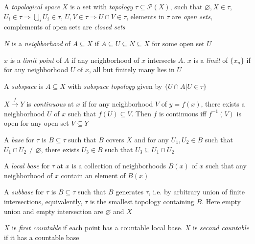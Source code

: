 \documentclass[main]{subfiles}
\begin{document}
\begin{definition}
A \textit{topological space} $X$ is a set with \textit{topology} $\tau\subseteq\mathscr{P}(X)$, such that $\varnothing,X\in\tau$, $U_i\in\tau\Rightarrow\bigcup_iU_i\in\tau$, $U,V\in\tau\Rightarrow U\cap V\in\tau$, elements in $\tau$ are \textit{open sets}, complements of open sets are \textit{closed sets} \par
$N$ is a \textit{neighborhood} of $A\subseteq X$ if $A\subseteq U\subseteq N\subseteq X$ for some open set $U$ \par
$x$ is a \textit{limit point} of $A$ if any neighborhood of $x$ intersects $A$. $x$ is a \textit{limit} of $\{x_n\}$ if for any neighborhood $U$ of $x$, all but finitely many lies in $U$ \par
A \textit{subspace} is $A\subseteq X$ with \textit{subspace topology} given by $\{U\cap A|U\in\tau\}$
\end{definition}

\begin{definition}
$X\xrightarrow fY$ is \textit{continuous} at $x$ if for any neighborhood $V$ of $y=f(x)$, there exists a neighborhood $U$ of $x$ such that $f(U)\subseteq V$. Then $f$ is continuous iff $f^{-1}(V)$ is open for any open set $V\subseteq Y$
\end{definition}

\begin{definition}
A \textit{base} for $\tau$ is $B\subseteq\tau$ such that $B$ covers $X$ and for any $U_1,U_2\in B$ such that $U_1\cap U_2\neq\varnothing$, there exists $U_3\in B$ such that $U_3\subseteq U_1\cap U_2$ \par
A \textit{local base} for $\tau$ at $x$ is a collection of neighborhoods $B(x)$ of $x$ such that any neighborhood of $x$ contain an element of $B(x)$ \par
A \textit{subbase} for $\tau$ is $B\subseteq\tau$ such that $B$ generates $\tau$, i.e. by arbitrary union of finite intersections, equivalently, $\tau$ is the smallest topology containing $B$. Here empty union and empty intersection are $\varnothing$ and $X$
\end{definition}

\begin{definition}
$X$ is \textit{first countable} if each point has a countable local base. $X$ is \textit{second countable} if it has a countable base
\end{definition}
\end{document}
